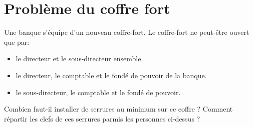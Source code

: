 \documentclass[a4paper,10pt]{exam}
\begin{document}
\section{Problème du coffre fort}

Une banque s'équipe d'un nouveau coffre-fort.
Le coffre-fort ne peut-être ouvert que par:
\begin{itemize}
  \item le directeur et le sous-directeur ensemble.
  \item le directeur, le comptable et le fondé de pouvoir de la banque.
  \item le sous-directeur, le comptable et le fondé de pouvoir.
\end{itemize}

Combien faut-il installer de serrures au minimum sur ce coffre ?
Comment répartir les clefs de ces serrures parmis les personnes
ci-dessus ?
\end{document}

